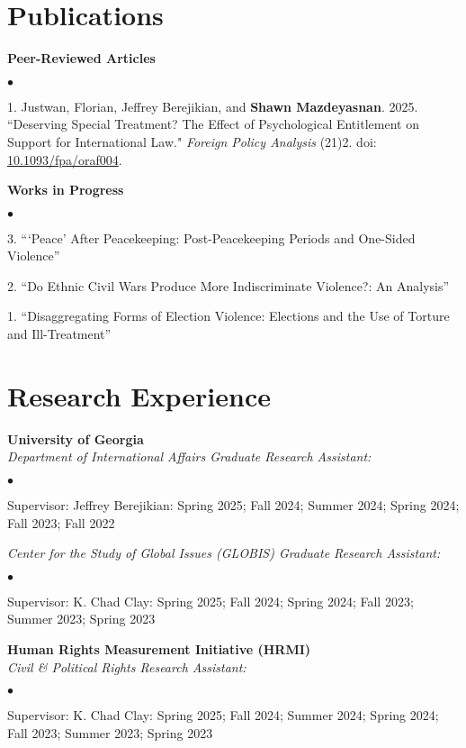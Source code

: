 \documentclass[letterpaper,12pt]{article}
\newenvironment{list2}{
  \begin{list}{$\bullet$}{%
      \setlength{\itemsep}{0in}
      \setlength{\parsep}{0in} 
      \setlength{\parskip}{0in}
      \setlength{\topsep}{0in} 
      \setlength{\partopsep}{0in}
      \setlength{\leftmargin}{1in}
      \setlength{\labelsep}{1em}
      \setlength{\labelwidth}{1em}
      \setlength{\itemindent}{-2em}
      \setlength{\listparindent}{2em}}}{\end{list}}
\begin{document}
\section{Publications}
\textbf{Peer-Reviewed Articles}
\par
\begin{list2}
    \item[1.] Justwan, Florian, Jeffrey Berejikian, and \textbf{Shawn Mazdeyasnan}. 2025. ``Deserving Special \mbox{Treatment?} The Effect of Psychological Entitlement on Support for International Law." \textit{\mbox{Foreign} Policy Analysis} (21)2. doi: \href{https://doi.org/10.1093/fpa/oraf004}{10.1093/fpa/oraf004}.
\end{list2}
\par
\textbf{Works in Progress}
\par
\begin{list2}
    \item[3.] ```Peace' After Peacekeeping: Post-Peacekeeping Periods and One-Sided Violence”
    \item[2.] ``Do Ethnic Civil Wars Produce More Indiscriminate Violence?: An Analysis”
    \item[1.] ``Disaggregating Forms of Election Violence: Elections and the Use of Torture and Ill-Treatment” 
\end{list2}

\section{Research Experience}
\textbf{University of Georgia}\\
\textit{Department of International Affairs Graduate Research Assistant:}
\begin{list2}
    \item Supervisor: Jeffrey Berejikian: Spring 2025; Fall 2024; Summer 2024; Spring 2024; Fall 2023; Fall 2022
\end{list2}
\par
\textit{Center for the Study of Global Issues (GLOBIS) Graduate Research Assistant:}
\begin{list2}
    \item Supervisor: K. Chad Clay: Spring 2025; Fall 2024; Spring 2024; Fall 2023; Summer 2023; Spring 2023
\end{list2}
\par
\textbf{Human Rights Measurement Initiative (HRMI)}\\
\textit{Civil \& Political Rights Research Assistant:}
\begin{list2}
    \item Supervisor: K. Chad Clay: Spring 2025; Fall 2024; Summer 2024; Spring 2024; Fall 2023; Summer 2023; Spring 2023
\end{list2}
\end{document}
